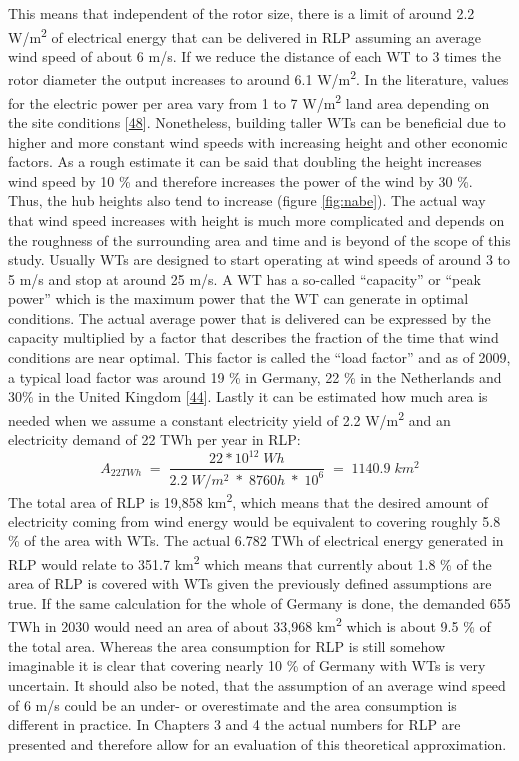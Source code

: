 \documentclass[a4paper,11pt]{article}
\begin{document}
This means that independent of the rotor size, there is a limit of around 2.2 W/m\textsuperscript{2} of electrical energy that can be delivered in RLP assuming an average wind speed of about 6 m/s. If we reduce the distance of each WT to 3 times the rotor diameter the output increases to around 6.1 W/m\textsuperscript{2}. In the literature, values for the electric power per area vary from 1 to 7 W/m\textsuperscript{2} land area depending on the site conditions {[}\protect\hyperlink{ref-SvenLinow.2020}{48}{]}. Nonetheless, building taller WTs can be beneficial due to higher and more constant wind speeds with increasing height and other economic factors. As a rough estimate it can be said that doubling the height increases wind speed by 10 \% and therefore increases the power of the wind by 30 \%. Thus, the hub heights also tend to increase (figure \ref{fig:nabe}). The actual way that wind speed increases with height is much more complicated and depends on the roughness of the surrounding area and time and is beyond of the scope of this study. Usually WTs are designed to start operating at wind speeds of around 3 to 5 m/s and stop at around 25 m/s. A WT has a so-called ``capacity'' or ``peak power'' which is the maximum power that the WT can generate in optimal conditions. The actual average power that is delivered can be expressed by the capacity multiplied by a factor that describes the fraction of the time that wind conditions are near optimal. This factor is called the ``load factor'' and as of 2009, a typical load factor was around 19 \% in Germany, 22 \% in the Netherlands and 30\% in the United Kingdom {[}\protect\hyperlink{ref-DavidJCMacKay.2009}{44}{]}. Lastly it can be estimated how much area is needed when we assume a constant electricity yield of 2.2 W/m\textsuperscript{2} and an electricity demand of 22 TWh per year in RLP:
\begin{equation}
A_{22TWh}\;=\;\frac{22 * 10^{12}\; Wh}{2.2\;W/m^2\; *\; 8760h\; *\; 10^6}\;=\;1140.9\;km^2
\end{equation}
The total area of RLP is 19,858 km\textsuperscript{2}, which means that the desired amount of electricity coming from wind energy would be equivalent to covering roughly 5.8 \% of the area with WTs. The actual 6.782 TWh of electrical energy generated in RLP would relate to 351.7 km\textsuperscript{2} which means that currently about 1.8 \% of the area of RLP is covered with WTs given the previously defined assumptions are true. If the same calculation for the whole of Germany is done, the demanded 655 TWh in 2030 would need an area of about 33,968 km\textsuperscript{2} which is about 9.5 \% of the total area. Whereas the area consumption for RLP is still somehow imaginable it is clear that covering nearly 10 \% of Germany with WTs is very uncertain. It should also be noted, that the assumption of an average wind speed of 6 m/s could be an under- or overestimate and the area consumption is different in practice. In Chapters 3 and 4 the actual numbers for RLP are presented and therefore allow for an evaluation of this theoretical approximation.
\end{document}

